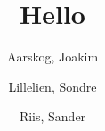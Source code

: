 \documentclass[11pt]{article}
\date{\displaydate{date}}
\author {
    Aarskog, Joakim\\
    \and
    Lillelien, Sondre\\
    \and
    Riis, Sander\\
}
\begin{document}
\title{Hello}
\maketitle



\end{document}

